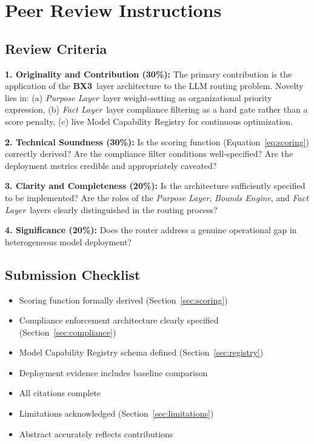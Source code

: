 \documentclass[12pt]{article}
\newcommand{\bxthree}{\textbf{BX3}}
\newcommand{\purpose}{\textit{Purpose Layer}}
\newcommand{\bounds}{\textit{Bounds Engine}}
\newcommand{\fact}{\textit{Fact Layer}}
\begin{document}
\section*{Peer Review Instructions}
\label{sec:peer-review}

\subsection*{Review Criteria}

\textbf{1. Originality and Contribution (30\%):} The primary contribution is the application of the \bxthree\ layer architecture to the LLM routing problem. Novelty lies in: (a) \purpose\ layer weight-setting as organizational priority expression, (b) \fact\ layer compliance filtering as a hard gate rather than a score penalty, (c) live Model Capability Registry for continuous optimization.

\textbf{2. Technical Soundness (30\%):} Is the scoring function (Equation~\ref{eq:scoring}) correctly derived? Are the compliance filter conditions well-specified? Are the deployment metrics credible and appropriately caveated?

\textbf{3. Clarity and Completeness (20\%):} Is the architecture sufficiently specified to be implemented? Are the roles of the \purpose, \bounds, and \fact\ layers clearly distinguished in the routing process?

\textbf{4. Significance (20\%):} Does the router address a genuine operational gap in heterogeneous model deployment?

\subsection*{Submission Checklist}

\begin{itemize}
    \item[ ] Scoring function formally derived (Section~\ref{sec:scoring})
    \item[ ] Compliance enforcement architecture clearly specified (Section~\ref{sec:compliance})
    \item[ ] Model Capability Registry schema defined (Section~\ref{sec:registry})
    \item[ ] Deployment evidence includes baseline comparison
    \item[ ] All citations complete
    \item[ ] Limitations acknowledged (Section~\ref{sec:limitations})
    \item[ ] Abstract accurately reflects contributions
\end{itemize}
\end{document}
